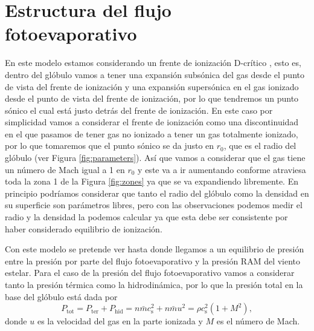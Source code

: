 \documentclass{book}
\begin{document}
\section{Estructura del flujo fotoevaporativo}\label{Estructura}

En este modelo  estamos considerando un frente de ionización D-crítico \citep{Shuu:1992}, esto es, dentro del glóbulo vamos a tener una expansión subsónica del gas desde el punto de vista del frente de ionización y una expansión supersónica en el gas ionizado desde el punto de vista del frente de ionización, por lo que tendremos un punto sónico el cual está justo detrás del frente de ionización. En este caso por simplicidad vamos a considerar el frente de ionización como una discontinuidad en el que pasamos de tener gas no ionizado a tener un gas totalmente ionizado, por lo que tomaremos que el punto sónico se da justo en $r_0$, que es el radio del glóbulo (ver Figura \ref{fig:parameters}). Así que vamos a considerar que el gas tiene un número de Mach igual a 1 en $r_0$ y este va a ir aumentando conforme atraviesa toda la zona 1 de la Figura \ref{fig:zones} ya que se va expandiendo libremente. En principio podríamos considerar que tanto el radio del glóbulo como la densidad en su superficie son parámetros libres, pero con las observaciones podemos medir el radio y la densidad la podemos calcular ya que esta debe ser consistente por haber considerado equilibrio de ionización.

Con este modelo se pretende ver hasta donde llegamos a un equilibrio de presión entre la presión por parte del flujo fotoevaporativo y la presión RAM del viento estelar. Para el caso de la presión del flujo fotoevaporativo vamos a considerar tanto la presión térmica como la hidrodinámica, por lo que la presión total en la base del glóbulo está dada por
\begin{equation}\label{eq: Presion total}
    P_\mathrm{tot}=P_\mathrm{ter}+P_\mathrm{hid}=n\bar{m}c_\mathrm{s}^2+n\bar{m}u^2=\rho c_\mathrm{s}^2(1+M^2),
\end{equation}
donde $u$ es la velocidad del gas en la parte ionizada y $M$ es el número de Mach. 
\end{document}
